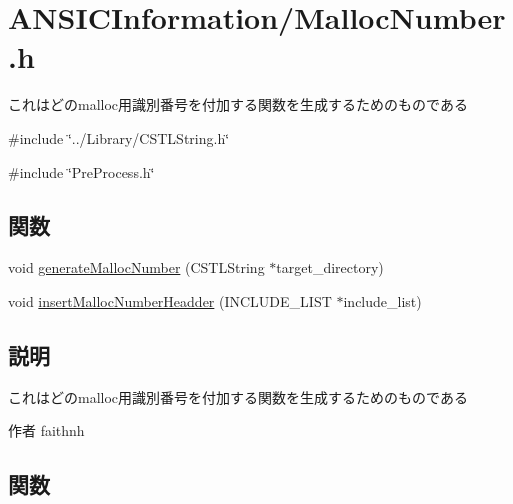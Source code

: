 \section{ANSICInformation/MallocNumber.h}
\label{MallocNumber_8h}


これはどのmalloc用識別番号を付加する関数を生成するためのものである  


{\ttfamily \#include \char`\"{}../Library/CSTLString.h\char`\"{}}\par
{\ttfamily \#include \char`\"{}PreProcess.h\char`\"{}}\par
\subsection*{関数}
\begin{DoxyCompactItemize}
\item 
void \hyperlink{MallocNumber_8h_a6a7ea0f1f8ad3055f1fd66b58a66635e}{generateMallocNumber} (CSTLString $\ast$target\_\-directory)
\item 
void \hyperlink{MallocNumber_8h_a898f92bb8363e245cb26af5855213035}{insertMallocNumberHeadder} (INCLUDE\_\-LIST $\ast$include\_\-list)
\end{DoxyCompactItemize}


\subsection{説明}
これはどのmalloc用識別番号を付加する関数を生成するためのものである \begin{DoxyAuthor}{作者}
faithnh 
\end{DoxyAuthor}


\subsection{関数}
